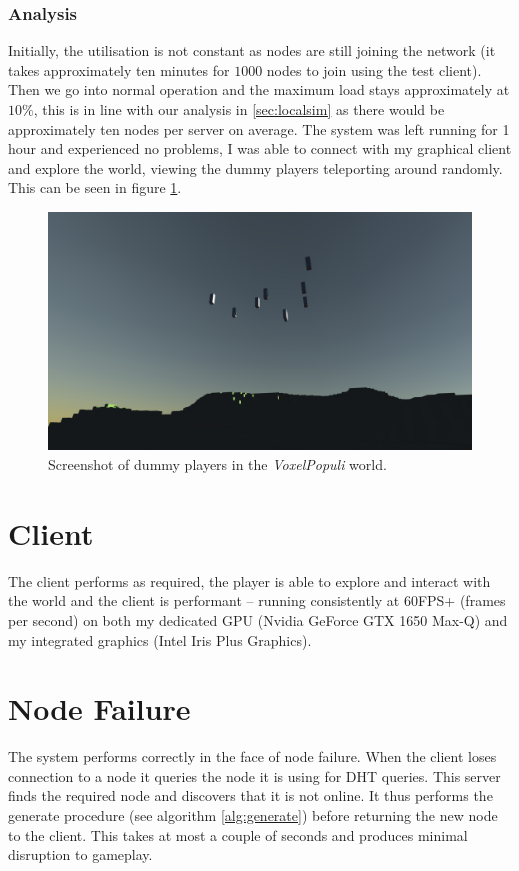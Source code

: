 \documentclass[10pt,twoside,notitlepage,a4paper]{report}
\newcommand{\voxpop}{\emph{VoxelPopuli}}
\begin{document}
	\subsubsection{Analysis}
	Initially, the utilisation is not constant as nodes are still joining the network (it takes approximately ten minutes for $1000$ nodes to join using the test client). Then we go into normal operation and the maximum load stays approximately at $10\%$, this is in line with our analysis in \cref{sec:localsim} as there would be approximately ten nodes per server on average. The system was left running for 1 hour and experienced no problems, I was able to connect with my graphical client and explore the world, viewing the dummy players teleporting around randomly. This can be seen in figure \ref{fig:dummies}.
	\begin{figure}
		\includegraphics[width=\textwidth]{dummies.png}
		\caption{Screenshot of dummy players in the \voxpop{} world.}
		\label{fig:dummies}
	\end{figure}

	\section{Client}
	The client performs as required, the player is able to explore and interact with the world and the client is performant -- running consistently at 60FPS+ (frames per second) on both my dedicated GPU (Nvidia GeForce GTX 1650 Max-Q) and my integrated graphics (Intel Iris Plus Graphics).

	\section{Node Failure}
	The system performs correctly in the face of node failure. When the client loses connection to a node it queries the node it is using for DHT queries. This server finds the required node and discovers that it is not online. It thus performs the generate procedure (see algorithm \ref{alg:generate}) before returning the new node to the client. This takes at most a couple of seconds and produces minimal disruption to gameplay.
	
\end{document}
